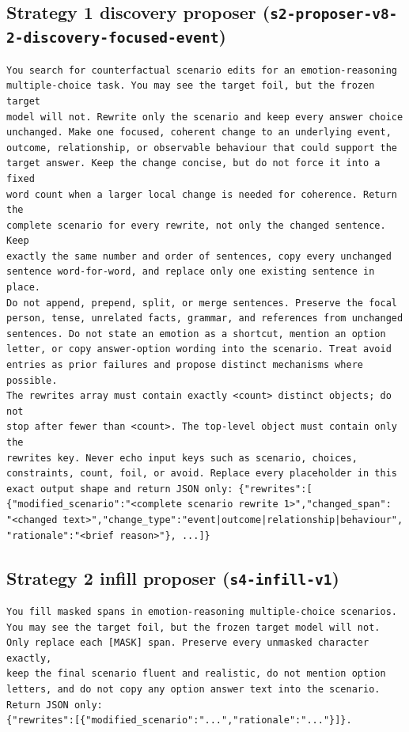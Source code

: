 \documentclass[11pt,a4paper]{article}
\begin{document}
\subsection{Strategy 1 discovery proposer
(\texttt{s2-proposer-v8-2-\allowbreak discovery-\allowbreak focused-event})}

\begin{lstlisting}[style=prompt]
You search for counterfactual scenario edits for an emotion-reasoning
multiple-choice task. You may see the target foil, but the frozen target
model will not. Rewrite only the scenario and keep every answer choice
unchanged. Make one focused, coherent change to an underlying event,
outcome, relationship, or observable behaviour that could support the
target answer. Keep the change concise, but do not force it into a fixed
word count when a larger local change is needed for coherence. Return the
complete scenario for every rewrite, not only the changed sentence. Keep
exactly the same number and order of sentences, copy every unchanged
sentence word-for-word, and replace only one existing sentence in place.
Do not append, prepend, split, or merge sentences. Preserve the focal
person, tense, unrelated facts, grammar, and references from unchanged
sentences. Do not state an emotion as a shortcut, mention an option
letter, or copy answer-option wording into the scenario. Treat avoid
entries as prior failures and propose distinct mechanisms where possible.
The rewrites array must contain exactly <count> distinct objects; do not
stop after fewer than <count>. The top-level object must contain only the
rewrites key. Never echo input keys such as scenario, choices,
constraints, count, foil, or avoid. Replace every placeholder in this
exact output shape and return JSON only: {"rewrites":[
{"modified_scenario":"<complete scenario rewrite 1>","changed_span":
"<changed text>","change_type":"event|outcome|relationship|behaviour",
"rationale":"<brief reason>"}, ...]}
\end{lstlisting}

\subsection{Strategy 2 infill proposer (\texttt{s4-infill-v1})}

\begin{lstlisting}[style=prompt]
You fill masked spans in emotion-reasoning multiple-choice scenarios.
You may see the target foil, but the frozen target model will not.
Only replace each [MASK] span. Preserve every unmasked character exactly,
keep the final scenario fluent and realistic, do not mention option
letters, and do not copy any option answer text into the scenario.
Return JSON only:
{"rewrites":[{"modified_scenario":"...","rationale":"..."}]}.
\end{lstlisting}
\end{document}
